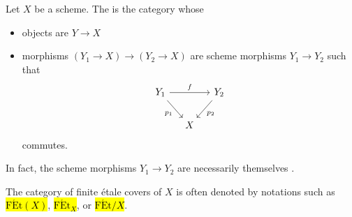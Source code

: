 \begin{definition} \label{definition:category_of_finite_etale_covers_of_a_scheme}
    Let $X$ be a scheme. 
    The  is the category whose 
    \begin{itemize}
        \item objects are  $Y \to X$
        \item morphisms $(Y_1 \to X) \to (Y_2 \to X)$ are scheme morphisms $Y_1 \to Y_2$ such that 
        \[
        \begin{tikzcd}[column sep=small]
        Y_1 \arrow[rr, "f"] \arrow[dr, "p_1"'] & & Y_2 \arrow[dl, "p_2"] \\
        & X & 
        \end{tikzcd}
        \]
        commutes.
    \end{itemize}
    In fact, the scheme morphisms $Y_1 \to Y_2$ are necessarily themselves  .

    The category of finite \'etale covers of $X$ is often denoted by notations such as \hl{$\mathrm{F\acute{E}t}(X)$}, \hl{$\mathrm{F\acute{E}t}_X$}, or \hl{$\mathrm{F\acute{E}t}/X$}.
\end{definition}